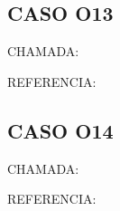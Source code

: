 \documentclass{undftex}
\begin{document}
\begin{refsection}\section*{CASO O13}\noindent CHAMADA: \par\noindent REFERENCIA:\par\printbibliography[heading=none]\end{refsection}\clearpage
\begin{refsection}\section*{CASO O14}\noindent CHAMADA: \par\noindent REFERENCIA:\par\printbibliography[heading=none]\end{refsection}\clearpage
\end{document}
